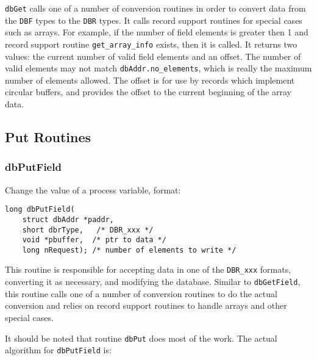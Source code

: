\verb|dbGet| calls one of a number of conversion routines in order to convert data from the \verb|DBF| types to the \verb|DBR| types.
It calls record support routines for special cases such as arrays.
For example, if the number of field elements is greater then 1 and record support routine \verb|get_array_info| exists, then it is called.
It returns two values:
the current number of valid field elements and an offset.
The number of valid elements may not match \verb|dbAddr.no_elements|, which is really the maximum number of elements allowed.
The offset is for use by records which implement circular buffers, and provides the offset to the current beginning of the array data.

\subsection{Put Routines}

\subsubsection{dbPutField}

Change the value of a process variable, format:

\begin{verbatim}
long dbPutField(
    struct dbAddr *paddr,
    short dbrType,   /* DBR_xxx */
    void *pbuffer,  /* ptr to data */
    long nRequest); /* number of elements to write */
\end{verbatim}

This routine is responsible for accepting data in one of the \verb|DBR_xxx| formats, converting it as necessary, and modifying the database.
Similar to \verb|dbGetField|, this routine calls one of a number of conversion routines to do the actual conversion and relies on record support routines to handle arrays and other special cases.

It should be noted that routine \verb|dbPut| does most of the work.
The actual algorithm for \verb|dbPutField| is:

